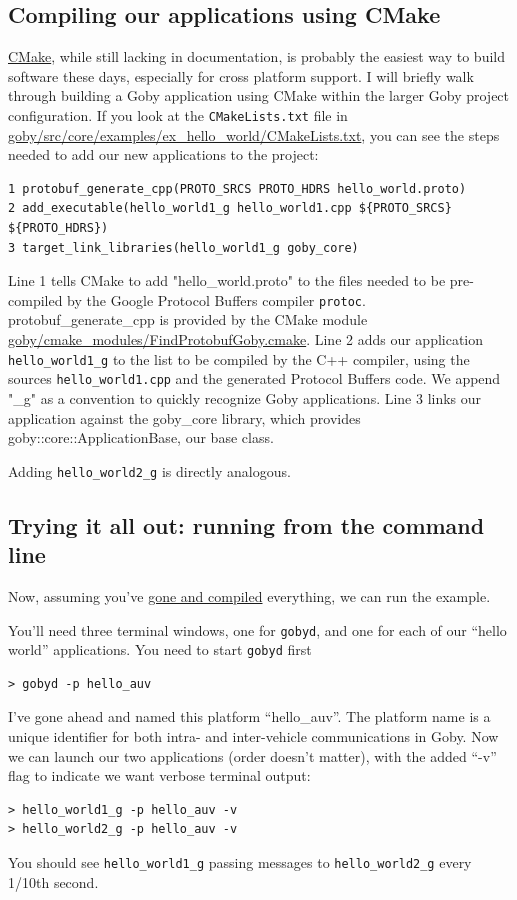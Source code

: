 \documentclass[11pt, letterpaper]{article}
\begin{document}
\subsection{Compiling our applications using CMake}

\href{http://www.cmake.org/}{CMake}, while still lacking in documentation, is probably the easiest way to build software these days, especially for cross platform support. I will briefly walk through building a Goby application using CMake within the larger Goby project configuration. If you look at the \texttt{CMakeLists.txt} file in \href{http://bazaar.launchpad.net/~goby-dev/goby/trunk/annotate/head:/src/core/examples/ex1_hello_world/CMakeLists.txt}{goby/src/core/examples/ex\_hello\_world/CMakeLists.txt}, you can see the steps needed to add our new applications to the project:

\begin{verbatim}
1 protobuf_generate_cpp(PROTO_SRCS PROTO_HDRS hello_world.proto)
2 add_executable(hello_world1_g hello_world1.cpp ${PROTO_SRCS} ${PROTO_HDRS})
3 target_link_libraries(hello_world1_g goby_core)
\end{verbatim}

Line 1 tells CMake to add "hello\_world.proto" to the files needed to be pre-compiled by the Google Protocol Buffers compiler \texttt{protoc}. protobuf\_generate\_cpp is provided by the CMake module \href{http://bazaar.launchpad.net/~goby-dev/goby/trunk/annotate/head:/cmake_modules/FindProtobufGoby.cmake}{goby/cmake\_modules/FindProtobufGoby.cmake}. Line 2 adds our application \texttt{hello\_world1\_g} to the list to be compiled by the C++ compiler, using the sources \texttt{hello\_world1.cpp} and the generated Protocol Buffers code. We append "\_g" as a convention to quickly recognize Goby applications. Line 3 links our application against the goby\_core library, which provides goby::core::ApplicationBase, our base class.

Adding \texttt{hello\_world2\_g} is directly analogous.

\subsection{Trying it all out: running from the command line}

Now, assuming you've \href{http://gobysoft.com/doc}{gone and compiled} everything, we can run the example.

You'll need three terminal windows, one for \texttt{gobyd}, and one for each of our ``hello world'' applications. You need to start \texttt{gobyd} first
\begin{verbatim}
> gobyd -p hello_auv
\end{verbatim}
I've gone ahead and named this platform ``hello\_auv''. The platform name is a unique identifier for both intra- and inter-vehicle communications in Goby. Now we can launch our two applications (order doesn't matter), with the added ``-v'' flag to indicate we want verbose terminal output:

\begin{verbatim}
> hello_world1_g -p hello_auv -v
> hello_world2_g -p hello_auv -v
\end{verbatim}

You should see \texttt{hello\_world1\_g} passing messages to \texttt{hello\_world2\_g} every 1/10th second.
\end{document}
